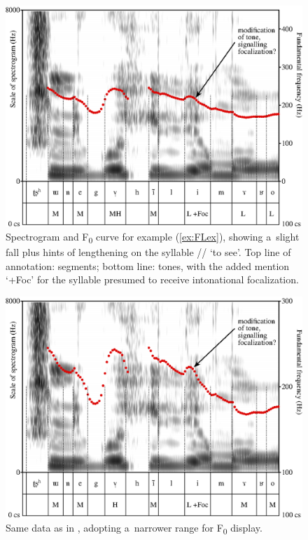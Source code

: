\begin{figure}[ht]
	\includegraphics[width=\textwidth]{figures/FL/FL.eps}
	\caption{Spectrogram and F\textsubscript{0} curve for example (\ref{ex:FLex}), showing a~slight fall plus hints of {lengthening} on the syllable // ‘to see’. Top line of annotation: segments; bottom line: tones, with the added mention ‘+Foc’ for the syllable presumed to receive intonational focalization.}
	\label{fig:FL}
\end{figure}

\begin{figure}[ht]
	\includegraphics[width=\textwidth]{figures/FL/FLCloseup.eps}
	\caption{Same data as in , adopting a~narrower range for F\textsubscript{0} display.}
	\label{fig:FLCloseup}
\end{figure}

